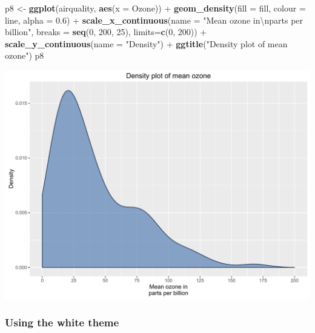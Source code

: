 \documentclass[]{article}
\newenvironment{Shaded}{\begin{snugshade}}{\end{snugshade}}
\newcommand{\KeywordTok}[1]{\textcolor[rgb]{0.13,0.29,0.53}{\textbf{{#1}}}}
\newcommand{\DataTypeTok}[1]{\textcolor[rgb]{0.13,0.29,0.53}{{#1}}}
\newcommand{\DecValTok}[1]{\textcolor[rgb]{0.00,0.00,0.81}{{#1}}}
\newcommand{\FloatTok}[1]{\textcolor[rgb]{0.00,0.00,0.81}{{#1}}}
\newcommand{\CharTok}[1]{\textcolor[rgb]{0.31,0.60,0.02}{{#1}}}
\newcommand{\StringTok}[1]{\textcolor[rgb]{0.31,0.60,0.02}{{#1}}}
\newcommand{\NormalTok}[1]{{#1}}
\begin{document}
\begin{Shaded}
\begin{Highlighting}[]
\NormalTok{p8 <-}\StringTok{ }\KeywordTok{ggplot}\NormalTok{(airquality, }\KeywordTok{aes}\NormalTok{(}\DataTypeTok{x =} \NormalTok{Ozone)) +}\StringTok{ }
\StringTok{      }\KeywordTok{geom_density}\NormalTok{(}\DataTypeTok{fill =} \NormalTok{fill, }\DataTypeTok{colour =} \NormalTok{line,}
                   \DataTypeTok{alpha =} \FloatTok{0.6}\NormalTok{) +}
\StringTok{      }\KeywordTok{scale_x_continuous}\NormalTok{(}\DataTypeTok{name =} \StringTok{"Mean ozone in}\CharTok{\textbackslash{}n}\StringTok{parts per billion"}\NormalTok{,}
                         \DataTypeTok{breaks =} \KeywordTok{seq}\NormalTok{(}\DecValTok{0}\NormalTok{, }\DecValTok{200}\NormalTok{, }\DecValTok{25}\NormalTok{),}
                         \DataTypeTok{limits=}\KeywordTok{c}\NormalTok{(}\DecValTok{0}\NormalTok{, }\DecValTok{200}\NormalTok{)) +}
\StringTok{      }\KeywordTok{scale_y_continuous}\NormalTok{(}\DataTypeTok{name =} \StringTok{"Density"}\NormalTok{) +}
\StringTok{      }\KeywordTok{ggtitle}\NormalTok{(}\StringTok{"Density plot of mean ozone"}\NormalTok{)}
\NormalTok{p8}
\end{Highlighting}
\end{Shaded}

\begin{center}\includegraphics{0_all_posts_pdf/density_8-1} \end{center}

\subsubsection{Using the white theme}\label{using-the-white-theme-7}
\end{document}
